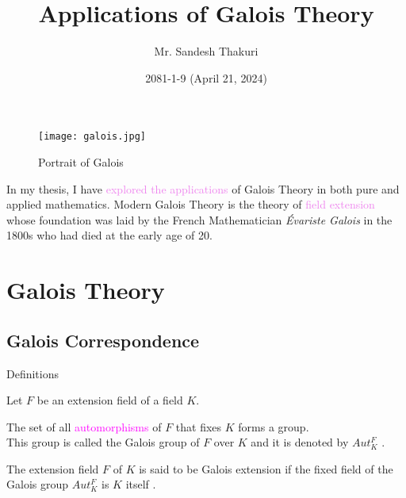 \documentclass{beamer}
\title{Applications of Galois Theory}
\author[Sandesh Thakuri]{Mr. Sandesh Thakuri}
\institute[CDM, TU]
{Central Department of Mathematics, IOST, TU}
\date{ 2081-1-9  (April 21, 2024)}
\begin{document}
\myfootline

\begin{frame}[plain]
  \tikzonlytitlepage
  \titlepage
\end{frame}

\begin{frame}[plain]
\begin{figure}[h!]
  \centering
  \texttt{[image: galois.jpg]}
  \caption{\footnotesize Portrait of Galois}
\end{figure}

In my thesis, I have \textcolor{violet}{explored the applications} of Galois Theory in both pure and applied mathematics. Modern Galois Theory is the theory of \textcolor{violet}{field extension} whose \textcolor{green!50!black}{foundation was laid by the French Mathematician \textit{Évariste Galois}} in the 1800s who had died at the early age of 20.
\end{frame}

\begin{frame}[plain]
  \begin{tcolorbox}[colframe=blue!80!violet, colback=white, boxsep=3mm,  title={ \large \bfseries Outlines}]
    \vspace{3mm}
    \tableofcontents
  \end{tcolorbox}
\end{frame}

\small
\section{Galois Theory}

\subsection{Galois Correspondence}
\begin{frame}{Definitions}

 Let \(F\) be an extension field of a field \(K\).
  \vspace{5mm}

  \begin{tcolorbox}[colframe=blue!40, colback=white, boxsep=1mm]
    \begin{definition} 
      The set of all \textcolor{magenta}{automorphisms} of \(F\) that fixes \(K\) forms a group.\\[2mm]
      This group is called the Galois group of \(F\) over \(K\) and it is denoted by \(Aut_K^F\) \cite{hunger}.
    \end{definition}
    \vspace{4mm}
    \begin{definition}
      The extension field \(F\) of \(K\) is said to be Galois extension if the fixed field of the Galois group \(Aut_K^F\) is \(K\) itself \cite{hunger}.
    \end{definition}
  \end{tcolorbox}
\end{frame}
\end{document}

